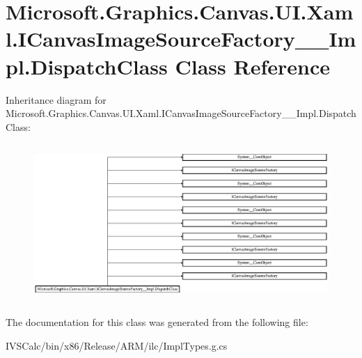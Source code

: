\hypertarget{class_microsoft_1_1_graphics_1_1_canvas_1_1_u_i_1_1_xaml_1_1_i_canvas_image_source_factory_____impl_1_1_dispatch_class}{}\section{Microsoft.\+Graphics.\+Canvas.\+U\+I.\+Xaml.\+I\+Canvas\+Image\+Source\+Factory\+\_\+\+\_\+\+Impl.\+Dispatch\+Class Class Reference}
\label{class_microsoft_1_1_graphics_1_1_canvas_1_1_u_i_1_1_xaml_1_1_i_canvas_image_source_factory_____impl_1_1_dispatch_class}
Inheritance diagram for Microsoft.\+Graphics.\+Canvas.\+U\+I.\+Xaml.\+I\+Canvas\+Image\+Source\+Factory\+\_\+\+\_\+\+Impl.\+Dispatch\+Class\+:\begin{figure}[H]
\begin{center}
\leavevmode
\includegraphics[height=6.039216cm]{class_microsoft_1_1_graphics_1_1_canvas_1_1_u_i_1_1_xaml_1_1_i_canvas_image_source_factory_____impl_1_1_dispatch_class}
\end{center}
\end{figure}


The documentation for this class was generated from the following file\+:\begin{DoxyCompactItemize}
\item 
I\+V\+S\+Calc/bin/x86/\+Release/\+A\+R\+M/ilc/Impl\+Types.\+g.\+cs\end{DoxyCompactItemize}
